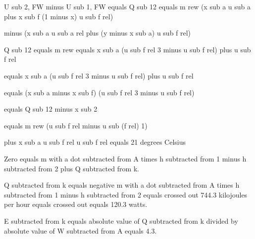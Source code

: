 U sub 2, FW minus U sub 1, FW equals Q sub 12 equals m rew (x sub a u sub a plus x sub f (1 minus x) u sub f rel)

minus (x sub a u sub a rel plus (y minus x sub a) u sub f rel)

Q sub 12 equals m rew equals x sub a (u sub f rel 3 minus u sub f rel) plus u sub f rel

equals x sub a (u sub f rel 3 minus u sub f rel) plus u sub f rel

equals (x sub a minus x sub f) (u sub f rel 3 minus u sub f rel)

equals Q sub 12 minus x sub 2

equals m rew (u sub f rel minus u sub (f rel) 1)

plus x sub a u sub f rel u sub f rel equals 21 degrees Celsius

Zero equals m with a dot subtracted from A times h subtracted from 1 minus h subtracted from 2 plus Q subtracted from k.

Q subtracted from k equals negative m with a dot subtracted from A times h subtracted from 1 minus h subtracted from 2 equals crossed out 744.3 kilojoules per hour equals crossed out equals 120.3 watts.

E subtracted from k equals absolute value of Q subtracted from k divided by absolute value of W subtracted from A equals 4.3.